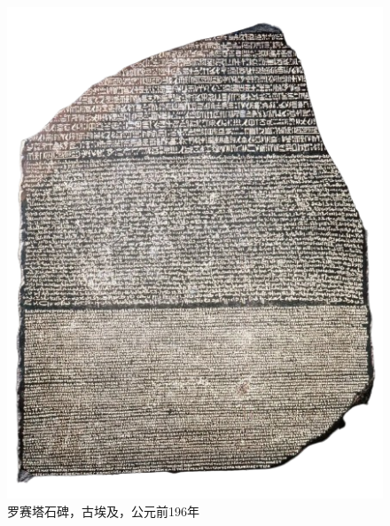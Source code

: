 \documentclass[b5paper]{ctexart}
\begin{document}
\begin{figure}[htbp]
 \centering
 \includegraphics[scale=0.4]{img/rosetta-stone}
 \caption{罗赛塔石碑，古埃及，公元前196年}
 \label{fig:rosetta-stone}
\end{figure}
\end{document}
